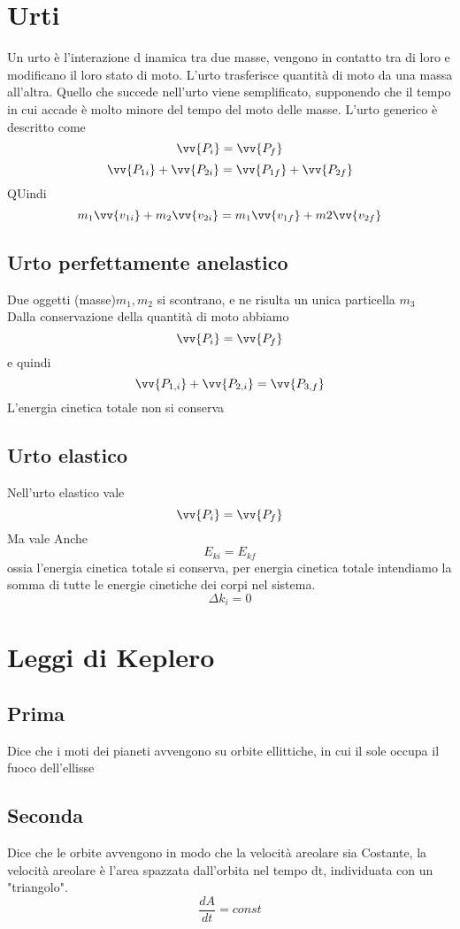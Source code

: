 \documentclass[a4paper]{report}
\begin{document}
  \section{Urti}
  Un urto è l'interazione d inamica tra due masse, vengono in contatto tra di loro e modificano il loro stato di moto.
  L'urto trasferisce quantità di moto da una massa all'altra. Quello che succede nell'urto viene semplificato, supponendo che il tempo in cui accade è molto minore del tempo del moto delle masse.
  L'urto generico è descritto come
  $$ \vv{P_i} = \vv{P_f}$$
  $$ \vv{P_{1i}} + \vv{P_{2i}} = \vv{P_{1f}} + \vv{P_{2f}}$$
  QUindi
  $$m_1 \vv{v_{1i}} + m_2 \vv{v_{2i}} = m_1 \vv{v_{1f}} + m2 \vv{v_{2f}}$$
  \subsection{Urto perfettamente anelastico}
  Due oggetti (masse)$m_1, m_2$ si scontrano, e ne risulta un unica particella $m_3$\\
  Dalla conservazione della quantità di moto abbiamo
  $$ \vv{P_i} = \vv{P_f} $$
  e quindi
  $$ \vv{P_{1,i}} + \vv{P_{2,i}} = \vv{P_{3,f}} $$
  L'energia cinetica totale non si conserva

  \subsection{Urto elastico}
  Nell'urto elastico vale
  $$\vv{P_i} = \vv{P_f}$$
  Ma vale Anche
  $$E_{ki} = E_{kf}$$
  ossia l'energia cinetica totale si conserva, per energia cinetica totale intendiamo la somma di tutte le energie cinetiche dei corpi nel sistema.
  $$ \Delta k_i = 0$$




  \section{Leggi di Keplero}
  \subsection{Prima}
  Dice che i moti dei pianeti avvengono su orbite ellittiche, in cui il sole occupa il fuoco dell'ellisse
  \subsection{Seconda}
  Dice che le orbite avvengono in modo che la velocità areolare sia Costante, la velocità areolare è l'area spazzata dall'orbita nel tempo dt, individuata con un "triangolo".
  $$ \frac{dA}{dt} = const$$
\end{document}
